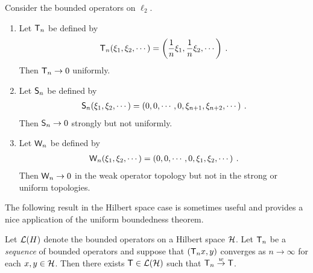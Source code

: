 \begin{example}
    Consider the bounded operators on $\ell_2$.
    \begin{enumerate}
        \item Let $\mathsf{T}_n$ be defined by \begin{align}
            \mathsf{T}_n (\xi_1, \xi_2, \cdots) = \left( \frac{1}{n} \xi_1, \frac{1}{n} \xi_2, \cdots \right) \:.
        \end{align}
        Then $\mathsf{T}_n \rightarrow 0$ uniformly.

        \item Let $\mathsf{S}_n$ be defined by \begin{align}
            \mathsf{S}_n(\xi_1, \xi_2, \cdots) = \left( 0,0, \cdots, 0, \xi_{n+1}, \xi_{n+2}, \cdots \right) \:.
        \end{align}
        Then $\mathsf{S}_n \rightarrow 0$ strongly but not uniformly.

        \item Let $\mathsf{W}_n$ be defined by \begin{align}
            \mathsf{W}_n(\xi_1, \xi_2, \cdots) = \left( 0,0, \cdots, 0, \xi_1, \xi_2, \cdots \right) \:.
        \end{align}
        Then $\mathsf{W}_n \rightarrow 0$ in the weak operator topology but not in the strong or uniform topologies.
    \end{enumerate}

\end{example}

The following result in the Hilbert space case is sometimes useful and provides
a nice application of the uniform boundedness theorem.

\begin{theorem}
    Let $\mathcal L(H)$ denote the bounded operators on a Hilbert space $\mathcal{H}$. Let $\mathsf{T}_n$ be a \textit{sequence} of bounded operators and suppose that $(\mathsf{T}_n x, y)$ converges as $n \rightarrow \infty$ for each $x,y \in \mathcal{H}$. Then there exists $\mathsf{T} \in \mathcal L(\mathcal{H})$ such that $\mathsf{T}_n \overset{w}\rightarrow \mathsf{T}$.
\end{theorem}

